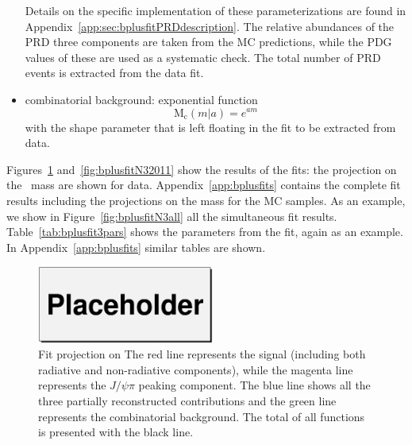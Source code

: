 \begin{itemize}
\begin{itemize}
	\end{itemize}
	Details on the specific implementation of these parameterizations
	are found in Appendix~\ref{app:sec:bplusfitPRDdescription}.
	The relative abundances of the PRD three components are taken from 
	the MC predictions, while the PDG values of these are used as a
	systematic check.
	The total number of PRD events is extracted from the data fit.

    \item combinatorial background:
	exponential function
	\[
	    \mathrm{M_{c}}(m|a)=e^{a m}
	\]
	with the shape parameter that is left floating in the fit
	to be extracted from data.
\end{itemize}

Figures~\ref{fig:bplusfitN12} and~\ref{fig:bplusfitN32011} show the results of the fits: 
the projection on the \Bp\ mass are shown for data.
Appendix~\ref{app:bplusfits} contains the complete fit results including the 
projections on the mass for the MC samples.
As an example, we show in Figure~\ref{fig:bplusfitN3all} all the simultaneous fit results. 
Table~\ref{tab:bplusfit3pars} shows the parameters from the fit, 
again as an example. In Appendix~\ref{app:bplusfits} similar
tables are shown.

\clearpage
\begin{figure}[!htb]
    \begin{center}
	\includegraphics[width=0.52\textwidth]{datafitN2.eps}
	\caption{Fit projection on 
	    The red line represents the \BpmKpmJpsi{} signal (including both radiative
	    and non-radiative components), while the magenta line represents the
	    $J/\psi\pi$ peaking component. The blue line shows all the three partially
	    reconstructed contributions and the green line represents the
	    combinatorial background. The total of all functions is presented
	with the black line.}
	\label{fig:bplusfitN12}
    \end{center}
\end{figure}

